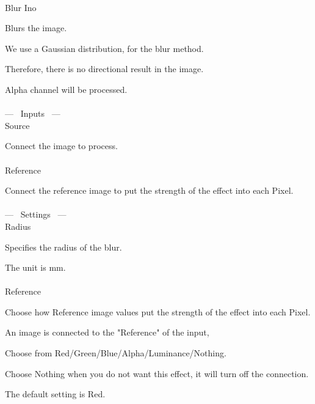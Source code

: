 \documentclass[a4paper,12pt]{article}
\begin{document}
\thispagestyle{empty}

\Large
\noindent \\
Blur Ino\medskip
\par
\normalsize
Blurs the image.\\
\par
We use a Gaussian distribution, for the blur method.\par
Therefore, there is no directional result in the image.\\
\par
Alpha channel will be processed.\\
\\
--- \ Inputs \ ---\\
Source\par
Connect the image to process.\\
\\
Reference\par
Connect the reference image to put the strength of the effect into each Pixel.\\
\\
--- \ Settings \ ---\\
Radius\par
Specifies the radius of the blur.\par
The unit is mm.\\
\\
Reference\par
Choose how Reference image values put the strength of the effect into each Pixel.\par
An image is connected to the "Reference" of the input,\par
Choose from Red/Green/Blue/Alpha/Luminance/Nothing.\par
Choose Nothing when you do not want this effect, it will turn off the connection.\par
The default setting is Red.
\end{document}
